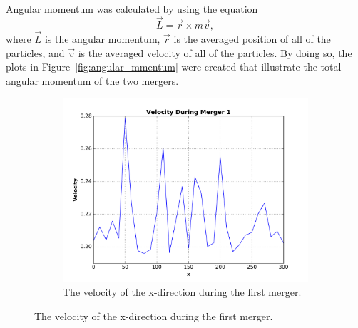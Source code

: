 \documentclass[12pt]{report}
\begin{document}
Angular momentum was calculated by using the equation
\begin{equation}\label{eqn:angularmomentum_eqn}
    \vec{L} = \vec{r} \times m \vec{v},
\end{equation}
where $\vec{L}$ is the angular momentum, $\vec{r}$ is the averaged position of all of the particles, and $\vec{v}$ is the averaged velocity of all of the particles. By doing so, the plots in Figure~\ref{fig:angular_mmentum} were created that illustrate the total angular momentum of the two mergers.

\begin{figure}[H]
\centering 
    \begin{subfigure}[b]{.475\textwidth}
        \centering
        \includegraphics[width=\linewidth]{velocity_merger1.png}
        \caption[]%
        {{The velocity of the x-direction during the first merger.}}
    

\end{subfigure}
\end{figure}
\end{document}
